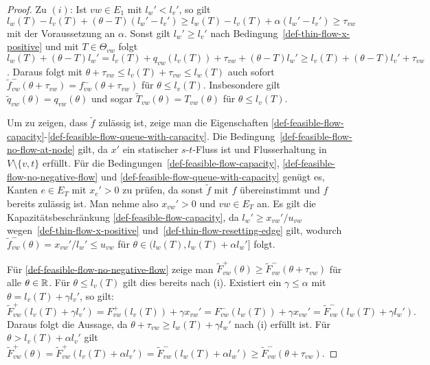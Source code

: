 \begin{proof}
	Zu $(i)$: Ist $vw\in E_1$ mit $l_w'<l_v'$, so gilt
	$l_w(T)-l_v(T) + (\theta - T)(l_w' - l_v') \geq l_w(T)-l_v(T)+\alpha(l_w'- l_v')\geq \tau_{vw}$  mit der Voraussetzung an $\alpha$.
	Sonst gilt $l_w' \geq l_v'$ nach Bedingung~\ref{def-thin-flow-x-positive} und mit $T\in \Theta_{vw}$ folgt $l_w(T)+(\theta-T)l_w'=l_v(T) + q_{vw}(l_v(T))+\tau_{vw}+(\theta - T)l_w' \geq l_v(T) + (\theta-T)l_v'+\tau_{vw}$.
	Daraus folgt mit $\theta + \tau_{vw} \leq l_v(T) + \tau_{vw} \leq l_w(T)$ auch sofort $\tilde{f}_{vw}^-(\theta + \tau_{vw}) = f_{vw}^-(\theta + \tau_{vw})$ für $\theta\leq l_v(T)$.
	Insbesondere gilt $\tilde{q}_{vw}(\theta) = q_{vw}(\theta)$ und sogar $ \tilde{T}_{vw}(\theta)= T_{vw}(\theta)$ für $\theta \leq l_v(T)$.
	
	Um zu zeigen, dass $\tilde{f}$ zulässig ist, zeige man die Eigenschaften \ref{def-feasible-flow-capacity}-\ref{def-feasible-flow-queue-with-capacity}.
	Die Bedingung~\ref{def-feasible-flow-no-flow-at-node} gilt, da $x'$ ein statischer $s$-$t$-Fluss ist und Flusserhaltung in $V\setminus \{ v, t \}$ erfüllt.
	Für die Bedingungen~\ref{def-feasible-flow-capacity}, \ref{def-feasible-flow-no-negative-flow} und \ref{def-feasible-flow-queue-with-capacity} genügt es, Kanten $e\in E_T$ mit $x_e' > 0$ zu prüfen, da sonst $\tilde{f}$ mit $f$ übereinstimmt und $f$ bereits zulässig ist.
	Man nehme also $x_{vw}' > 0$ und $vw\in E_T$ an.
	Es gilt die Kapazitätsbeschränkung \ref{def-feasible-flow-capacity}, da $l_w'\geq x_{vw}' / u_{vw}$ wegen~\ref{def-thin-flow-x-positive} und~\ref{def-thin-flow-resetting-edge} gilt, wodurch $\tilde{f}^-_{vw}(\theta)=x_{vw}'/l_w'\leq u_{vw}$ für $\theta\in(l_w(T), l_w(T)+\alpha l_w']$ folgt.
	
	Für \ref{def-feasible-flow-no-negative-flow} zeige man $\tilde{F}^+_{vw}(\theta)\geq \tilde{F}_{vw}^-(\theta+\tau_{vw})$ für alle $\theta\in\mathbb{R}$.
	Für $\theta\leq l_v(T)$ gilt dies bereits nach (i).
	Existiert ein $\gamma\leq\alpha$ mit $\theta=l_v(T) + \gamma l_v'$, so gilt:
	\begin{equation}\label{eq-extension-nash-flow}
	\tilde{F}_{vw}^+(l_v(T) + \gamma l_v')=F_{vw}^+(l_v(T))+\gamma x_{vw}' = F_{vw}^-(l_w(T))+ \gamma x_{vw}'= \tilde{F}_{vw}^-(l_w(T)+\gamma l_w').
	\end{equation}
	Daraus folgt die Aussage, da $\theta + \tau_{vw}\geq l_w(T) + \gamma l_w'$ nach (i) erfüllt ist.
	Für $\theta > l_v(T)+\alpha l_v'$ gilt $\tilde{F}_{vw}^+(\theta) = \tilde{F}_{vw}^+(l_v(T) + \alpha l_v') = \tilde{F}_{vw}^-(l_w(T) + \alpha l_w') \geq \tilde{F}_{vw}^-(\theta + \tau_{vw})$.
	

\end{proof}
